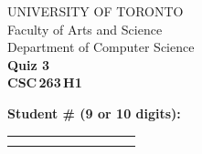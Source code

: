 \documentclass[12pt]{article}
\begin{document}
\begin{center}\large
UNIVERSITY OF TORONTO\\
Faculty of Arts and Science\\[1.75ex]
Department of Computer Science\\[1.75ex]
\textbf{Quiz 3} \\
\textbf{{CSC\,263\,H1}}
\end{center}


\noindent \textbf{Student \# (9 or 10 digits):} \begin{table}[H]
\begin{tabular}{|c|c|c|c|c|c|c|c|c|c|}
\hline
\hspace{1.2em}\; & \hspace{1.2em}\; & \hspace{1.2em}\; & \hspace{1.2em}\; & \hspace{1.2em}\; & \hspace{1.2em}\; & \hspace{1.2em}\; & \hspace{1.2em}\; & \hspace{1.2em}\; & \hspace{1.2em}\; \\
\hspace{1.2em}\; & \hspace{1.2em}\; & \hspace{1.2em}\; & \hspace{1.2em}\; & \hspace{1.2em}\; & \hspace{1.2em}\; & \hspace{1.2em}\; & \hspace{1.2em}\; & \hspace{1.2em}\; & \hspace{1.2em}\;\\\hline
\end{tabular}%
\end{table}
\end{document}
